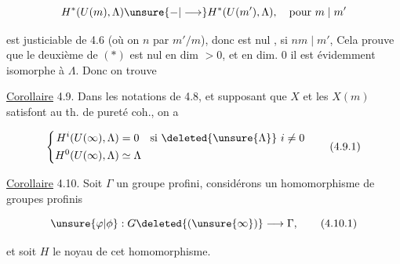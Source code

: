 
\[
H^*(U(m),\Lambda)\unsure{{-}|\longrightarrow}H^*(U(m'),\Lambda),\quad\text{pour }m\mid m'
\]

est justiciable de 4.6 (où on  $n$ par $m'/m$), donc est nul , si $nm\mid m'$,   Cela prouve que le deuxième  de $(*)$ est nul en dim $>0$, et en dim. 0 il est évidemment isomorphe à $\Lambda$. Donc on trouve

\uline{Corollaire} 4.9. Dans les notations de 4.8, et supposant que $X$ et les $X(m)$ satisfont au th. de pureté coh.,  on a

\[
\left\{\begin{aligned}
H^i(U(\infty),\Lambda)&=0\quad\text{si }\deleted{\unsure{\Lambda}}\ i\ne0\\
H^0(U(\infty),\Lambda)&\simeq\Lambda
\end{aligned}\right.
\tag*{(4.9.1)}
\]



\uline{Corollaire} 4.10.  Soit $\Gamma$ un groupe profini, considérons un homomorphisme de groupes profinis

\[
\unsure{\varphi|\phi}:G\deleted{(\unsure{\infty})}\longrightarrow\Gamma,
\tag*{(4.10.1)}
\]

et soit $H$ le noyau de cet homomorphisme.
